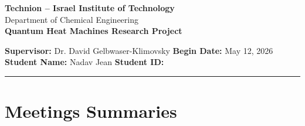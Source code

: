 \documentclass{article}
\numberwithin{equation}{subsection}
\begin{document}
\begin{center}
    {\large \bf Technion -- Israel Institute of Technology} \\
    {\large Department of Chemical Engineering} \\
    \vspace{4mm}
    {\Large \bf Quantum Heat Machines Research Project} \\
    \vspace{3mm}
    \begin{solutionbox}[width=0.9\textwidth]{}
        \textbf{Supervisor:} Dr. David Gelbwaser-Klimovsky \hfill \textbf{Begin Date:} May 12, 2026 \\
        \textbf{Student Name:} Nadav Jean \hfill \textbf{Student ID:} 
    \end{solutionbox}
\end{center}

\hrule height 1pt
\vspace{4mm}

\begin{abstract}
Some notes on meetings with David, as well as some of the derivations for the Python simulations. 
\end{abstract}

\section{Meetings Summaries}
\end{document}

